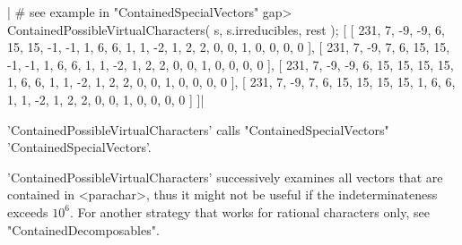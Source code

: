 |    # see example in "ContainedSpecialVectors"
    gap> ContainedPossibleVirtualCharacters( s, s.irreducibles, rest );
    [ [ 231, 7, -9, -9, 6, 15, 15, -1, -1, 1, 6, 6, 1, 1, -2, 1, 2, 2, 0,
          0, 1, 0, 0, 0, 0 ],
      [ 231, 7, -9, 7, 6, 15, 15, -1, -1, 1, 6, 6, 1, 1, -2, 1, 2, 2, 0,
          0, 1, 0, 0, 0, 0 ],
      [ 231, 7, -9, -9, 6, 15, 15, 15, 15, 1, 6, 6, 1, 1, -2, 1, 2, 2, 0,
          0, 1, 0, 0, 0, 0 ],
      [ 231, 7, -9, 7, 6, 15, 15, 15, 15, 1, 6, 6, 1, 1, -2, 1, 2, 2, 0,
          0, 1, 0, 0, 0, 0 ] ]|

'ContainedPossibleVirtualCharacters'   calls    "ContainedSpecialVectors"
'ContainedSpecialVectors'.

'ContainedPossibleVirtualCharacters' successively examines   all  vectors
that  are contained in  <parachar>, thus  it  might not  be useful if the
indeterminateness exceeds  $10^6$.   For another strategy that  works for
rational characters only, see "ContainedDecomposables".


